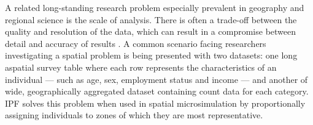\documentclass[a4paper,10pt]{article}
\begin{document}
A related long-standing research problem especially prevalent in geography and regional science
is the scale of analysis. There is often a trade-off between the quality and resolution 
of the data, which can result in a compromise between detail and accuracy of results 
\citep{ballas2003microsimulation-30-years}. A common scenario facing researchers investigating 
a spatial problem is being presented with two datasets: one long aspatial 
survey table where each row represents the characteristics of an individual --- such as
age, sex, employment status and income --- and another of wide, geographically aggregated 
dataset containing count data for each category. IPF solves this problem when used in
spatial microsimulation by proportionally assigning individuals to zones of which they
are most representative.

\end{document}

